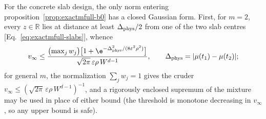 For the concrete slab design, the only norm entering
proposition~\ref{prop:exactmfull-b0} has a closed Gaussian form.  First,
for \(m=2\), every \(z\in\mathbb R\) lies at distance at least
\(\Delta_{\rm phys}/2\) from one of the two slab centres
[Eq.~\eqref{eq:exactmfull-slabs}], whence
\begin{equation}
 v_\infty\le
 \frac{\bigl(\max_jw_j\bigr)
       \bigl[1+\e^{-\Delta_{\rm phys}^2/(8\varepsilon^2\rho^2)}\bigr]}
      {\sqrt{2\pi}\,\varepsilon\rho\,W^{d-1}},
 \qquad
 \Delta_{\rm phys}=|\mu(t_1)-\mu(t_2)|;
 \label{eq:exactmfull-b0-vinf}
\end{equation}
for general \(m\), the normalization \(\sum_jw_j=1\) gives the cruder
\(v_\infty\le(\sqrt{2\pi}\,\varepsilon\rho\,W^{d-1})^{-1}\), and a
rigorously enclosed supremum of the mixture may be used in place of either
bound (the threshold is monotone decreasing in \(v_\infty\), so any upper
bound is safe).


